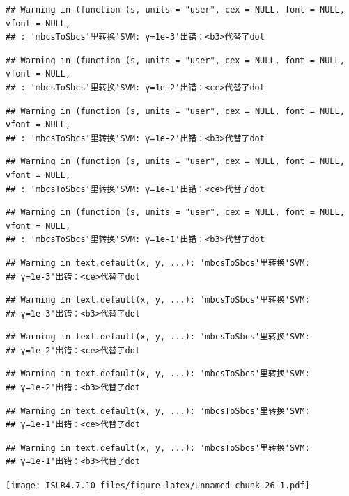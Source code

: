 \documentclass[
]{article}
\begin{document}
\begin{verbatim}
## Warning in (function (s, units = "user", cex = NULL, font = NULL, vfont = NULL,
## : 'mbcsToSbcs'里转换'SVM: γ=1e-3'出错：<b3>代替了dot
\end{verbatim}

\begin{verbatim}
## Warning in (function (s, units = "user", cex = NULL, font = NULL, vfont = NULL,
## : 'mbcsToSbcs'里转换'SVM: γ=1e-2'出错：<ce>代替了dot
\end{verbatim}

\begin{verbatim}
## Warning in (function (s, units = "user", cex = NULL, font = NULL, vfont = NULL,
## : 'mbcsToSbcs'里转换'SVM: γ=1e-2'出错：<b3>代替了dot
\end{verbatim}

\begin{verbatim}
## Warning in (function (s, units = "user", cex = NULL, font = NULL, vfont = NULL,
## : 'mbcsToSbcs'里转换'SVM: γ=1e-1'出错：<ce>代替了dot
\end{verbatim}

\begin{verbatim}
## Warning in (function (s, units = "user", cex = NULL, font = NULL, vfont = NULL,
## : 'mbcsToSbcs'里转换'SVM: γ=1e-1'出错：<b3>代替了dot
\end{verbatim}

\begin{verbatim}
## Warning in text.default(x, y, ...): 'mbcsToSbcs'里转换'SVM:
## γ=1e-3'出错：<ce>代替了dot
\end{verbatim}

\begin{verbatim}
## Warning in text.default(x, y, ...): 'mbcsToSbcs'里转换'SVM:
## γ=1e-3'出错：<b3>代替了dot
\end{verbatim}

\begin{verbatim}
## Warning in text.default(x, y, ...): 'mbcsToSbcs'里转换'SVM:
## γ=1e-2'出错：<ce>代替了dot
\end{verbatim}

\begin{verbatim}
## Warning in text.default(x, y, ...): 'mbcsToSbcs'里转换'SVM:
## γ=1e-2'出错：<b3>代替了dot
\end{verbatim}

\begin{verbatim}
## Warning in text.default(x, y, ...): 'mbcsToSbcs'里转换'SVM:
## γ=1e-1'出错：<ce>代替了dot
\end{verbatim}

\begin{verbatim}
## Warning in text.default(x, y, ...): 'mbcsToSbcs'里转换'SVM:
## γ=1e-1'出错：<b3>代替了dot
\end{verbatim}

\texttt{[image: ISLR4.7.10\_files/figure-latex/unnamed-chunk-26-1.pdf]}
\end{document}

